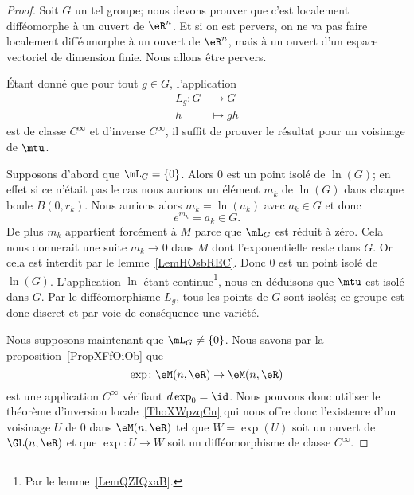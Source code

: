 \begin{proof}
    Soit \( G\) un tel groupe; nous devons prouver que c'est localement difféomorphe à un ouvert de \( \eR^n\). Et si on est pervers, on ne va pas faire localement difféomorphe à un ouvert de \( \eR^n\), mais à un ouvert d'un espace vectoriel de dimension finie. Nous allons être pervers.

    Étant donné que pour tout \( g\in G\), l'application
    \begin{equation}
        \begin{aligned}
            L_g\colon G&\to G \\
            h&\mapsto gh
        \end{aligned}
    \end{equation}
    est de classe \(  C^{\infty}\) et d'inverse \(  C^{\infty}\), il suffit de prouver le résultat pour un voisinage de \( \mtu\).

    Supposons d'abord que \( \mL_G=\{ 0 \}\). Alors \( 0\) est un point isolé de \( \ln(G)\); en effet si ce n'était pas le cas nous aurions un élément \( m_k\) de \( \ln(G)\) dans chaque boule \( B(0,r_k)\). Nous aurions alors \( m_k=\ln(a_k)\) avec \( a_k\in G\) et donc
    \begin{equation}
        e^{m_k}=a_k\in G.
    \end{equation}
    De plus \( m_k\) appartient forcément à \( M\) parce que \( \mL_G\) est réduit à zéro. Cela nous donnerait une suite \( m_k\to 0\) dans \( M\) dont l'exponentielle reste dans \( G\). Or cela est interdit par le lemme~\ref{LemHOsbREC}. Donc \( 0\) est un point isolé de \( \ln(G)\). L'application \(\ln\) étant continue\footnote{Par le lemme~\ref{LemQZIQxaB}.}, nous en déduisons que \( \mtu\) est isolé dans \( G\). Par le difféomorphisme \( L_g\), tous les points de \( G\) sont isolés; ce groupe est donc discret et par voie de conséquence une variété.

    Nous supposons maintenant que \( \mL_G\neq\{ 0 \}\). Nous savons par la proposition~\ref{PropXFfOiOb} que
    \begin{equation}
        \exp\colon \eM(n,\eR)\to \eM(n,\eR)
    \end{equation}
    est une application \(  C^{\infty}\) vérifiant \( d\exp_0=\id\). Nous pouvons donc utiliser le théorème d'inversion locale~\ref{ThoXWpzqCn} qui nous offre donc l'existence d'un voisinage \( U\) de \( 0\) dans \( \eM(n,\eR)\) tel que \( W=\exp(U)\) soit un ouvert de \( \GL(n,\eR)\) et que \( \exp\colon U\to W\) soit un difféomorphisme de classe \(  C^{\infty}\).


\end{proof}
